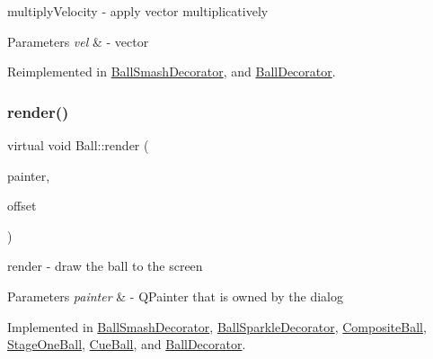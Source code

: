 multiply\+Velocity -\/ apply vector multiplicatively 


\begin{DoxyParams}{Parameters}
{\em vel} & -\/ vector \\
\hline
\end{DoxyParams}


Reimplemented in \mbox{\hyperlink{class_ball_smash_decorator_a017998926f2b3ebdfcf49e074ea86aae}{Ball\+Smash\+Decorator}}, and \mbox{\hyperlink{class_ball_decorator_ad1a9139a5c41d17d0eebf007afb984e7}{Ball\+Decorator}}.

\mbox{\label{class_ball_a307773aaa59aee90cef8767b0c22deca}} 
\subsubsection{\texorpdfstring{render()}{render()}}
{\footnotesize\ttfamily virtual void Ball\+::render (\begin{DoxyParamCaption}\item[{Q\+Painter \&}]{painter,  }\item[{const Q\+Vector2D \&}]{offset }\end{DoxyParamCaption})\hspace{0.3cm}{\ttfamily [pure virtual]}}



render -\/ draw the ball to the screen 


\begin{DoxyParams}{Parameters}
{\em painter} & -\/ Q\+Painter that is owned by the dialog \\
\hline
\end{DoxyParams}


Implemented in \mbox{\hyperlink{class_ball_smash_decorator_a8cbf47d481100f16f2376670fee9fdcc}{Ball\+Smash\+Decorator}}, \mbox{\hyperlink{class_ball_sparkle_decorator_ad3ee562f1cc9dfa5835bca2fab3d30a7}{Ball\+Sparkle\+Decorator}}, \mbox{\hyperlink{class_composite_ball_a2aefe32771e1cde5dc8f51d779c880eb}{Composite\+Ball}}, \mbox{\hyperlink{class_stage_one_ball_aa4f7f52cb8946b59c201d724dc0dc5bd}{Stage\+One\+Ball}}, \mbox{\hyperlink{class_cue_ball_a915a83205e4cfc720fbd884b045e2f81}{Cue\+Ball}}, and \mbox{\hyperlink{class_ball_decorator_af8205f8033b2490ecd3365c24ff5cdeb}{Ball\+Decorator}}.

\mbox{\label{class_ball_a88546ffd1a37b301a5c7085f3eabe8f0}} 
